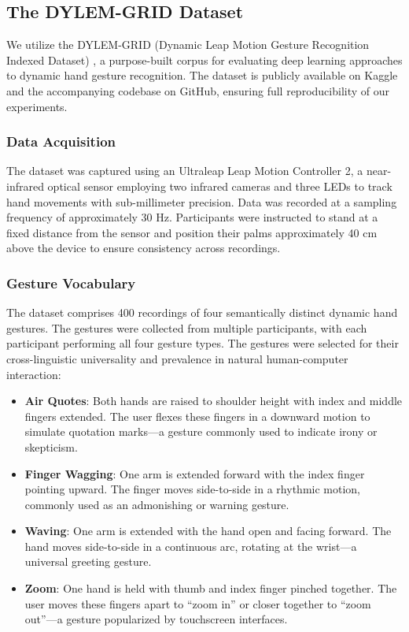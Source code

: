 \documentclass[conference]{IEEEtran}
\begin{document}
\subsection{The DYLEM-GRID Dataset}
We utilize the DYLEM-GRID (Dynamic Leap Motion Gesture Recognition Indexed Dataset) \cite{dylem2024}, a purpose-built corpus for evaluating deep learning approaches to dynamic hand gesture recognition. The dataset is publicly available on Kaggle and the accompanying codebase on GitHub, ensuring full reproducibility of our experiments.

\subsubsection{Data Acquisition}
The dataset was captured using an Ultraleap Leap Motion Controller 2, a near-infrared optical sensor employing two infrared cameras and three LEDs to track hand movements with sub-millimeter precision. Data was recorded at a sampling frequency of approximately 30 Hz. Participants were instructed to stand at a fixed distance from the sensor and position their palms approximately 40 cm above the device to ensure consistency across recordings.

\subsubsection{Gesture Vocabulary}
The dataset comprises 400 recordings of four semantically distinct dynamic hand gestures. The gestures were collected from multiple participants, with each participant performing all four gesture types. The gestures were selected for their cross-linguistic universality and prevalence in natural human-computer interaction:

\begin{itemize}
    \item \textbf{Air Quotes}: Both hands are raised to shoulder height with index and middle fingers extended. The user flexes these fingers in a downward motion to simulate quotation marks---a gesture commonly used to indicate irony or skepticism.
    
    \item \textbf{Finger Wagging}: One arm is extended forward with the index finger pointing upward. The finger moves side-to-side in a rhythmic motion, commonly used as an admonishing or warning gesture.
    
    \item \textbf{Waving}: One arm is extended with the hand open and facing forward. The hand moves side-to-side in a continuous arc, rotating at the wrist---a universal greeting gesture.
    
    \item \textbf{Zoom}: One hand is held with thumb and index finger pinched together. The user moves these fingers apart to ``zoom in'' or closer together to ``zoom out''---a gesture popularized by touchscreen interfaces.
\end{itemize}
\end{document}

